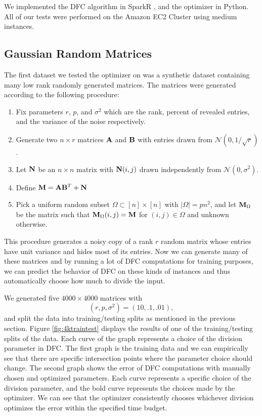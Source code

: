 We implemented the DFC algorithm in SparkR \cite{V13}, and the optimizer 
in Python. All of our tests were performed on the Amazon EC2 Cluster 
using medium instances. 

\subsection{Gaussian Random Matrices}
The first dataset we tested the optimizer on was a synthetic 
dataset containing many low rank randomly generated matrices. 
The matrices were generated according to the following procedure: 
\begin{enumerate}
\item Fix parameters $r$, $p$, and $\sigma^2$ which are the rank, 
percent of revealed entries, and the variance of the noise respectively.
\item Generate two $n \times r$ matrices ${\bf A}$ and ${\bf B}$ with 
entries drawn from $\mathcal{N}(0,1/\sqrt{r})$. 
\item Let ${\bf N}$ be an $n \times n$ matrix with ${\bf N}(i,j)$ drawn 
independently from $\mathcal{N}(0,\sigma^2)$. 
\item Define ${\bf M} = {\bf A}{\bf B}^T + {\bf N}$
\item Pick a uniform random subset $\Omega \subset [n] \times [n]$ 
with $|\Omega| = pn^2$, and let ${\bf M}_{\Omega}$ be the matrix such 
that ${\bf M}_{\Omega}(i,j) = {\bf M}$ for $(i,j) \in \Omega$ and 
unknown otherwise. 
\end{enumerate}
This procedure generates a noisy copy of a rank $r$ random matrix 
whose entries have unit variance and hides most of its entries. 
Now we can generate many of these matrices and by running a lot of 
DFC computations for training purposes, we can predict the behavior 
of DFC on these kinds of instances and thus automatically 
choose how much to divide the input. 

We generated five $4000 \times 4000$ matrices with 
\[(r,p,\sigma^2) = (10,.1,.01),\] 
and split the data into training/testing splits as mentioned 
in the previous section. Figure \ref{fig:4ktraintest} displays the 
results of one of the training/testing splits of the data. 
Each curve of the graph represents a choice of the division parameter 
in DFC. The first graph is the training data and we can empirically 
see that there are specific intersection points where the parameter 
choice should change. The second graph shows the error of DFC 
computations with manually chosen and optimized parameters. 
Each curve represents a specific choice of the division parameter, 
and the bold curve represents the choices made by the optimizer. 
We can see that the optimizer consistently chooses whichever division 
optimizes the error within the specified time budget. 

